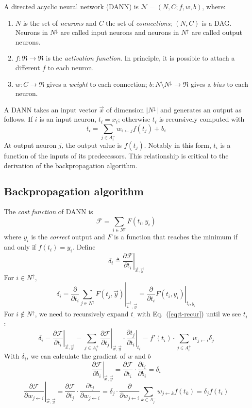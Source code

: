 \documentclass{bioinfo}
\begin{document}
\begin{methods}
A directed acyclic neural network (DANN) is $\mathcal{N}=(N,C;f,w,b)$, where:
\begin{enumerate}
\item $N$ is the set of \emph{neurons} and $C$ the set of \emph{connections};
	$(N,C)$ is a DAG. Neurons in $N^{\downarrow}$ are called input neurons
	and neurons in $N^{\uparrow}$ are called output neurons.
\item $f:\Re\to\Re$ is the \emph{activation function}. In principle, it is
	possible to attach a different $f$ to each neuron.
\item $w:C\to\Re$ gives a \emph{weight} to each connection; $b:N\setminus
	N^{\downarrow}\to\Re$ gives a \emph{bias} to each neuron.
\end{enumerate}

A DANN takes an input vector $\vec{x}$ of dimension $|N^{\downarrow}|$ and
generates an output as follows. If $i$ is an input neuron, $t_i=x_i$; otherwise
$t_i$ is recursively computed with
\begin{equation}\label{eq:t-recur}
t_i=\sum_{j\in A^-_i} w_{i\gets j}f(t_j)+b_i
\end{equation}
At output neuron $j$, the output value is $f(t_j)$.  Notably in this form,
$t_i$ is a function of the inputs of its predecessors. This relationship is
critical to the derivation of the backpropagation algorithm.

\subsection{Backpropagation algorithm}

The \emph{cost function} of DANN is
\[
\mathcal{F} = \sum_{i\in N^{\uparrow}} F(t_i,y_i)
\]
where $y_i$ is the \emph{correct} output and $F$ is a function that reaches the
minimum if and only if $f(t_i)=y_i$. Define
\[
\delta_i\triangleq\left.\frac{\partial\mathcal{F}}{\partial t_i}\right|_{\vec{x},\vec{y}}
\]
For $i\in N^{\uparrow}$,
\[
\delta_i=\left.\frac{\partial}{\partial t_i}\sum_{j\in N^{\uparrow}} F(t_j,\vec{y})\right|_{\vec{t}^{\uparrow},\vec{y}}=\left.\frac{\partial}{\partial t_i}F(t_i,y_i)\right|_{t_i,y_i}
\]
For $i\not\in N^{\uparrow}$, we need to recursively expand $t_{\cdot}$ with
Eq.~(\ref{eq:t-recur}) until we see $t_i$:
\[
\delta_i=\left.\frac{\partial\mathcal{F}}{\partial t_i}\right|_{\vec{x},\vec{y}}
=\sum_{j\in A^+_{i}}\left.\frac{\partial\mathcal{F}}{\partial t_j}\right|_{\vec{x},\vec{y}}\cdot
\left.\frac{\partial t_j}{\partial t_i}\right|_{t_i}
=f'(t_i)\cdot\sum_{j\in A_i^+}w_{j\gets i}\delta_j
\]
With $\delta_i$, we can calculate the gradient of $w$ and $b$
\[
\left.\frac{\partial \mathcal{F}}{\partial b_i}\right|_{\vec{x},\vec{y}}=\frac{\partial \mathcal{F}}{\partial t_i}\cdot\frac{\partial t_i}{\partial b_i}=\delta_i
\]
\[
\left.\frac{\partial \mathcal{F}}{\partial w_{j\gets i}}\right|_{\vec{x},\vec{y}}=\frac{\partial \mathcal{F}}{\partial t_j}\cdot\frac{\partial t_j}{\partial w_{j\gets i}}
	=\delta_j\cdot\frac{\partial}{\partial w_{j\gets i}}\sum_{k\in A^-_j} w_{j\gets k}f(t_k)=\delta_j f(t_i)
\]


\end{methods}
\end{document}
